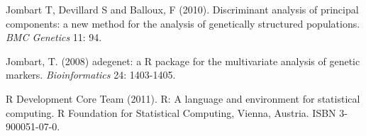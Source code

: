 \documentclass{article}
\begin{document}
\begin{thebibliography}{9}

  Jombart T, Devillard S and Balloux, F (2010).
  Discriminant analysis of principal components: a new method for the analysis of genetically structured populations.
  \textit{BMC Genetics} 11: 94.

  Jombart, T. (2008) adegenet: a R package for the multivariate
  analysis of genetic markers. \textit{Bioinformatics} 24: 1403-1405.

  R Development Core Team (2011). R: A language and environment for
  statistical computing. R Foundation for Statistical Computing,
  Vienna, Austria. ISBN 3-900051-07-0.

\end{thebibliography}
\end{document}
